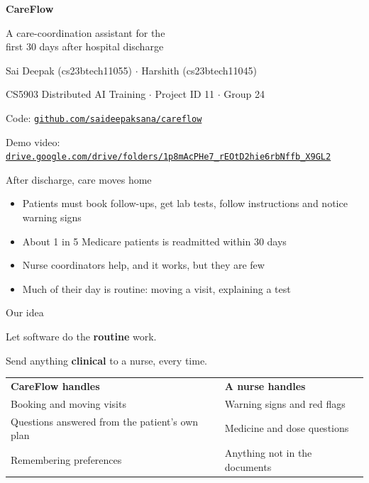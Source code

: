 \documentclass[aspectratio=169,12pt]{beamer}
\begin{document}
\begin{frame}[plain]
\centering\vspace{0.6cm}
{\color{customblue}\fontsize{34}{40}\selectfont\bfseries CareFlow\par}\vspace{3mm}
{\Large A care-coordination assistant for the\\first 30 days after hospital discharge\par}\vspace{7mm}
{\large Sai Deepak (cs23btech11055) \;$\cdot$\; Harshith (cs23btech11045)\par}\vspace{3mm}
CS5903 Distributed AI Training \;$\cdot$\; Project ID 11 \;$\cdot$\; Group 24\par\vspace{3mm}
{\small Code: \href{https://github.com/saideepaksana/careflow}{\texttt{github.com/saideepaksana/careflow}}\par}\vspace{1mm}
{\small Demo video: \href{https://drive.google.com/drive/folders/1p8mAcPHe7_rEOtD2hie6rbNffb_X9GL2?usp=sharing}{\nolinkurl{drive.google.com/drive/folders/1p8mAcPHe7_rEOtD2hie6rbNffb_X9GL2}}\par}
\end{frame}

\begin{frame}{After discharge, care moves home}
\begin{itemize}\setlength\itemsep{10pt}
\item Patients must book follow-ups, get lab tests, follow instructions and notice warning signs
\item About 1 in 5 Medicare patients is readmitted within 30 days
\item Nurse coordinators help, and it works, but they are few
\item Much of their day is routine: moving a visit, explaining a test
\end{itemize}
\end{frame}

\begin{frame}{Our idea}
\centering\vspace{4mm}
{\Large Let software do the \textbf{routine} work.\par}\vspace{6mm}
{\Large Send anything \textbf{clinical} to a nurse, every time.\par}\vspace{10mm}
\begin{tabular}{>{\raggedright\arraybackslash}p{}>{\raggedright\arraybackslash}p{}}
\textbf{\color{good}CareFlow handles} & \textbf{\color{warn}A nurse handles}\\[2pt]
Booking and moving visits & Warning signs and red flags\\
Questions answered from the patient's own plan & Medicine and dose questions\\
Remembering preferences & Anything not in the documents\\
\end{tabular}
\end{frame}
\end{document}
